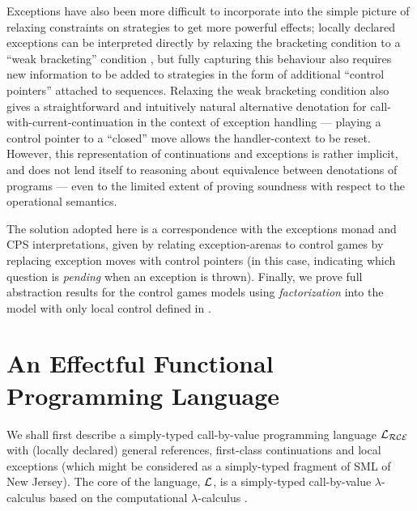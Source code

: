 \documentclass{eptcs}
\def\L{{\cal{L}}}
\newcommand{\Lce}{{\cal{L_{RCE}}}}
\begin{document}
Exceptions have also been more difficult to incorporate into the simple picture of relaxing constraints on strategies to get more powerful effects;  locally declared exceptions can be interpreted directly by relaxing the bracketing condition to a ``weak bracketing'' condition \cite{Lli}, but fully capturing this behaviour also  requires new information to be added to strategies in the form of additional ``control pointers'' attached to sequences. 
 Relaxing the weak bracketing condition also gives a  straightforward and intuitively natural alternative denotation for call-with-current-continuation in the context of exception handling --- playing a control pointer to  a ``closed'' move allows the handler-context to be reset. However, this representation of continuations and exceptions is rather implicit, and does not lend itself to reasoning about equivalence between denotations of programs --- even to the limited extent of  proving soundness with respect to the operational semantics.



The solution adopted here is a  correspondence with the exceptions monad and CPS interpretations, given by relating exception-arenas to control games by replacing exception moves with control pointers (in this case, indicating which question is \emph{pending} when an exception is thrown).  Finally, we prove  full abstraction results for the control games models using \emph{factorization} into the model with only local control defined in \cite{AHM}.  





\section{An Effectful Functional Programming  Language} 
We shall first describe a simply-typed call-by-value programming language $\Lce$ with (locally declared) general references,  first-class continuations and local exceptions (which might be considered as a simply-typed fragment of SML of New Jersey). The core of the language, $\L$, is a simply-typed call-by-value $\lambda$-calculus based on the computational $\lambda$-calculus \cite{MogC}.
\end{document}
